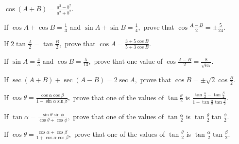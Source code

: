 \item $\cos(A + B) = \frac{a^2 - b^2}{a^2 + b^2}$.
\stopitemize
\item If $\cos A + \cos B = \frac{1}{3}$ and $\sin A + \sin B = \frac{1}{4},$ prove that $\cos \frac{A - B}{2} =
  \pm\frac{5}{24}$.
\item If $2\tan \frac{A}{2} = \tan \frac{B}{2},$ prove that $\cos A = \frac{3 + 5\cos B}{5 + 3\cos B}$.
\item If $\sin A = \frac{4}{5}$ and $\cos B = \frac{5}{13},$ prove that one value of $\cos \frac{A - B}{2} =
  \frac{8}{\sqrt{65}}$.
\item If $\sec(A + B) + \sec(A - B) = 2\sec A,$ prove that $\cos B = \pm \sqrt{2}\cos \frac{B}{2}$.
\item If $\cos \theta = \frac{\cos\alpha\cos\beta}{1 - \sin\alpha\sin\beta},$ prove that one of the values of $\tan
     \frac{\theta}{2}$ is $\frac{\tan \frac{\alpha}{2} - \tan\frac{\beta}{2}}{1 - \tan\frac{\alpha}{2}\tan\frac{\beta}{2}}$.
\item If $\tan\alpha = \frac{\sin\theta\sin\phi}{\cos\theta + \cos\phi},$ prove that one of the values of
     $\tan\frac{\alpha}{2}$ is $\tan\frac{\theta}{2}\tan\frac{\phi}{2}$.
\item If $\cos\theta = \frac{\cos\alpha + \cos\beta}{1 + \cos\alpha\cos\beta},$ prove that one of the values of
     $\tan\frac{\theta}{2}$ is $\tan\frac{\alpha}{2}\tan\frac{\beta}{2}$.
\stopitemize

